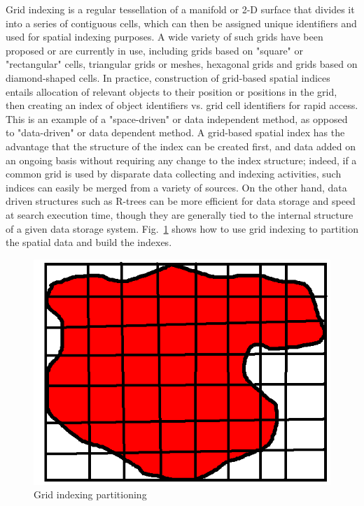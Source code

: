 Grid indexing is a regular tessellation of a manifold or 2-D surface that divides it into a series of contiguous cells, which can then be assigned unique identifiers and used for spatial indexing purposes. A wide variety of such grids have been proposed or are currently in use, including grids based on "square" or "rectangular" cells, triangular grids or meshes, hexagonal grids and grids based on diamond-shaped cells. In practice, construction of grid-based spatial indices entails allocation of relevant objects to their position or positions in the grid, then creating an index of object identifiers vs. grid cell identifiers for rapid access. This is an example of a "space-driven" or data independent method, as opposed to "data-driven" or data dependent method. A grid-based spatial index has the advantage that the structure of the index can be created first, and data added on an ongoing basis without requiring any change to the index structure; indeed, if a common grid is used by disparate data collecting and indexing activities, such indices can easily be merged from a variety of sources. On the other hand, data driven structures such as R-trees can be more efficient for data storage and speed at search execution time, though they are generally tied to the internal structure of a given data storage system. Fig.~\ref{fig:grid} shows how to use grid indexing to partition the spatial data and build the indexes.
 
\begin{figure}[htb!]
\centering
\includegraphics[width=0.90\columnwidth]{figures/grid.png}
\caption{Grid indexing partitioning}
\label{fig:grid}
\end{figure}
 
